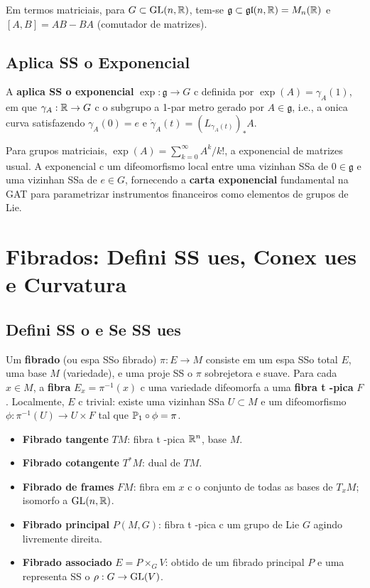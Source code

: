 Em termos matriciais, para $G\subset\mathrm{GL}(n,\mathbb{R})$, tem-se $\mathfrak{g}\subset\mathfrak{gl}(n,\mathbb{R})=M_n(\mathbb{R})$ e $[A,B]=AB-BA$ (comutador de matrizes).

\subsection{Aplica SS o Exponencial}

\begin{defi}
A \textbf{aplica SS o exponencial} $\exp:\mathfrak{g}\to G$ c definida por $\exp(A)=\gamma_A(1)$, em que $\gamma_A:\mathbb{R}\to G$ c o subgrupo a 1-par metro gerado por $A\in\mathfrak{g}$, i.e., a onica curva satisfazendo $\gamma_A(0)=e$ e $\dot\gamma_A(t) = (L_{\gamma_A(t)})_*A$.
\end{defi}

Para grupos matriciais, $\exp(A) = \sum_{k=0}^\infty A^k/k!$, a exponencial de matrizes usual. A exponencial c um difeomorfismo local entre uma vizinhan SSa de $0\in\mathfrak{g}$ e uma vizinhan SSa de $e\in G$, fornecendo a \textbf{carta exponencial} fundamental na GAT para parametrizar instrumentos financeiros como elementos de grupos de Lie.

\section{Fibrados: Defini SS ues, Conex ues e Curvatura}
\label{sec:fibrados}

\subsection{Defini SS o e Se SS ues}

\begin{defi}
Um \textbf{fibrado} (ou espa SSo fibrado) $\pi:E\to M$ consiste em um espa SSo total $E$, uma base $M$ (variedade), e uma proje SS o $\pi$ sobrejetora e suave. Para cada $x\in M$, a \textbf{fibra} $E_x=\pi^{-1}(x)$ c uma variedade difeomorfa a uma \textbf{fibra t -pica} $F$. Localmente, $E$ c trivial: existe uma vizinhan SSa $U\subset M$ e um difeomorfismo $\phi:\pi^{-1}(U)\to U\times F$ tal que $\mathbb{P}_1\circ\phi = \pi$.
\end{defi}

\begin{ex}
\begin{itemize}
 \item \textbf{Fibrado tangente} $TM$: fibra t -pica $\mathbb{R}^n$, base $M$.
 \item \textbf{Fibrado cotangente} $T^*M$: dual de $TM$.
 \item \textbf{Fibrado de frames} $FM$: fibra em $x$ c o conjunto de todas as bases de $T_xM$; isomorfo a $\mathrm{GL}(n,\mathbb{R})$.
 \item \textbf{Fibrado principal} $P(M,G)$: fibra t -pica c um grupo de Lie $G$ agindo livremente direita.
 \item \textbf{Fibrado associado} $E = P\times_G V$: obtido de um fibrado principal $P$ e uma representa SS o $\rho:G\to\mathrm{GL}(V)$.
\end{itemize}
\end{ex}

